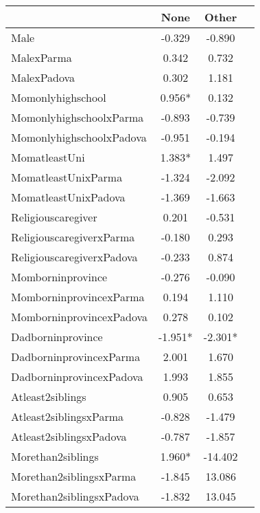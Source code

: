 \begin{tabular}{l c c c}
\toprule
& None & Other \\
\midrule
Male &    -0.329 &    -0.890 \\
MalexParma &     0.342 &     0.732 \\
MalexPadova &     0.302 &     1.181 \\
Momonlyhighschool & 0.956* &     0.132 \\
MomonlyhighschoolxParma &    -0.893 &    -0.739 \\
MomonlyhighschoolxPadova &    -0.951 &    -0.194 \\
MomatleastUni & 1.383* &     1.497 \\
MomatleastUnixParma &    -1.324 &    -2.092 \\
MomatleastUnixPadova &    -1.369 &    -1.663 \\
Religiouscaregiver &     0.201 &    -0.531 \\
ReligiouscaregiverxParma &    -0.180 &     0.293 \\
ReligiouscaregiverxPadova &    -0.233 &     0.874 \\
Momborninprovince &    -0.276 &    -0.090 \\
MomborninprovincexParma &     0.194 &     1.110 \\
MomborninprovincexPadova &     0.278 &     0.102 \\
Dadborninprovince & -1.951* & -2.301* \\
DadborninprovincexParma &     2.001 &     1.670 \\
DadborninprovincexPadova &     1.993 &     1.855 \\
Atleast2siblings &     0.905 &     0.653 \\
Atleast2siblingsxParma &    -0.828 &    -1.479 \\
Atleast2siblingsxPadova &    -0.787 &    -1.857 \\
Morethan2siblings & 1.960* &   -14.402 \\
Morethan2siblingsxParma &    -1.845 &    13.086 \\
Morethan2siblingsxPadova &    -1.832 &    13.045 \\
\bottomrule
\end{tabular}
